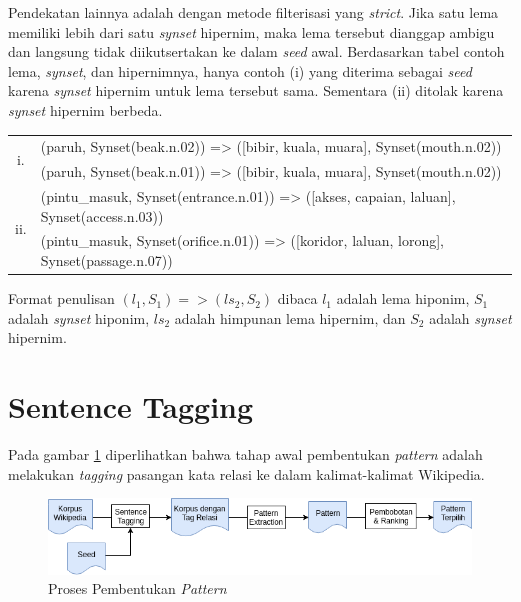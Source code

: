 Pendekatan lainnya adalah dengan metode filterisasi yang \textit{strict}. Jika satu lema memiliki lebih dari satu \textit{synset} hipernim, maka lema tersebut dianggap ambigu dan langsung tidak diikutsertakan ke dalam \textit{seed} awal. Berdasarkan tabel contoh lema, \textit{synset}, dan hipernimnya, hanya contoh (i) yang diterima sebagai \textit{seed} karena \textit{synset} hipernim untuk lema tersebut sama. Sementara (ii) ditolak karena \textit{synset} hipernim berbeda.

\begin{center}
\begin{tabular}{ |c|m{30em}| } 
  \hline
  \multirow{2}{*}{i.} 
  & (paruh, Synset(beak.n.02)) => ([bibir, kuala, muara], Synset(mouth.n.02)) \\ 
  & (paruh, Synset(beak.n.01)) => ([bibir, kuala, muara], Synset(mouth.n.02)) \\ \hline
\multirow{2}{*}{ii.} 
  & (pintu\_masuk, Synset(entrance.n.01)) => ([akses, capaian, laluan], Synset(access.n.03)) \\ 
  & (pintu\_masuk, Synset(orifice.n.01)) => ([koridor, laluan, lorong], Synset(passage.n.07)) \\ \hline
\end{tabular}
\end{center}

\noindent Format penulisan $(l_1, S_1) => (ls_2, S_2)$ dibaca $l_1$ adalah lema hiponim, $S_1$ adalah \textit{synset} hiponim, $ls_2$ adalah himpunan lema hipernim, dan $S_2$ adalah \textit{synset} hipernim. 
%

%
\section{Sentence Tagging}
Pada gambar \ref{fig:pattern-extraction} diperlihatkan bahwa tahap awal pembentukan \textit{pattern} adalah melakukan \textit{tagging} pasangan kata relasi ke dalam kalimat-kalimat Wikipedia. 

\begin{figure}
    \centering
    \includegraphics[width=\linewidth]{pics/Pic03-PatternExtraction}
    \caption{Proses Pembentukan \textit{Pattern}}
    \label{fig:pattern-extraction}
\end{figure}

